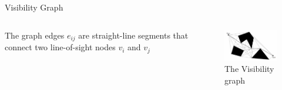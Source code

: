 \documentclass[handout]{beamer}
\begin{document}
  \begin{frame}{Visibility Graph}

    \begin{columns}
      \begin{column}[]{0.4\textwidth}
        The graph edges $e_{ij}$ are straight-line segments that connect two line-of-sight nodes $v_{i}$ and $v_{j}$
      \end{column}
      \begin{column}[]{0.6\textwidth}
        \begin{center}
        \begin{figure}
          \includegraphics[width=60mm]{fig/fig_03_visibility_graph.png}
          \caption{The Visibility graph}
          \label{fig:fig03}
        \end{figure}
       \end{center}
      \end{column}
    \end{columns}
    
  \end{frame}
\end{document}
